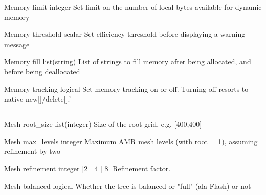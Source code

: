 \documentclass{book}
\begin{document}
\Parameter
{Memory}
{}
{limit}
{integer}
{}
{Set limit on the number of local bytes available for dynamic memory}
{}
{}

\Parameter
{Memory}
{}
{threshold}
{scalar}
{}
{Set efficiency threshold before displaying a warning message}
{}
{}

\Parameter
{Memory}
{}
{fill}
{list(string)}
{}
{List of strings to fill memory after being allocated, and before being deallocated}
{}
{}

\Parameter
{Memory}
{}
{tracking}
{logical}
{}
{Set memory tracking on or off. Turning off resorts to native new[]/delete[].'}
{}
{}

\subsection{}

\Parameter
{Mesh}
{}
{root\_size}
{list(integer)}
{}
{Size of the root grid, e.g. [400,400]}
{}
{}

\Parameter
{Mesh}
{}
{max\_levels}
{integer}
{}
{Maximum AMR mesh levels (with root = 1), assuming refinement by two}
{}
{}

\Parameter
{Mesh}
{}
{refinement}
{integer}
{[2 $|$ 4 $|$ 8]}
{Refinement factor.}
{}
{}

\Parameter
{Mesh}
{}
{balanced}
{logical}
{}
{Whether the tree is balanced or "full" (ala Flash) or not}
{}
{}
\end{document}
